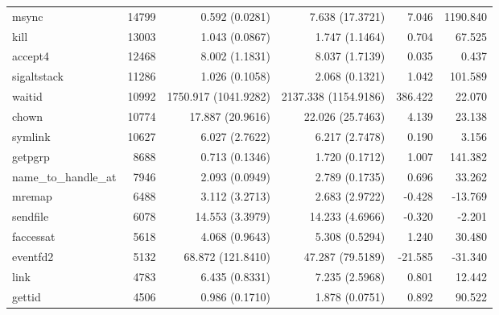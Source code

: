 \begin{longtable}{>{\ttfamily}lrrrrr}
                          msync &      14799 &              0.592 (0.0281) &           7.638 (17.3721) &           7.046 &     1190.840 \\
                           kill &      13003 &              1.043 (0.0867) &            1.747 (1.1464) &           0.704 &       67.525 \\
                        accept4 &      12468 &              8.002 (1.1831) &            8.037 (1.7139) &           0.035 &        0.437 \\
                    sigaltstack &      11286 &              1.026 (0.1058) &            2.068 (0.1321) &           1.042 &      101.589 \\
                         waitid &      10992 &        1750.917 (1041.9282) &      2137.338 (1154.9186) &         386.422 &       22.070 \\
                          chown &      10774 &            17.887 (20.9616) &          22.026 (25.7463) &           4.139 &       23.138 \\
                        symlink &      10627 &              6.027 (2.7622) &            6.217 (2.7478) &           0.190 &        3.156 \\
                        getpgrp &       8688 &              0.713 (0.1346) &            1.720 (0.1712) &           1.007 &      141.382 \\
           name\_to\_handle\_at &       7946 &              2.093 (0.0949) &            2.789 (0.1735) &           0.696 &       33.262 \\
                         mremap &       6488 &              3.112 (3.2713) &            2.683 (2.9722) &          -0.428 &      -13.769 \\
                       sendfile &       6078 &             14.553 (3.3979) &           14.233 (4.6966) &          -0.320 &       -2.201 \\
                      faccessat &       5618 &              4.068 (0.9643) &            5.308 (0.5294) &           1.240 &       30.480 \\
                       eventfd2 &       5132 &           68.872 (121.8410) &          47.287 (79.5189) &         -21.585 &      -31.340 \\
                           link &       4783 &              6.435 (0.8331) &            7.235 (2.5968) &           0.801 &       12.442 \\
                         gettid &       4506 &              0.986 (0.1710) &            1.878 (0.0751) &           0.892 &       90.522 \\

\end{longtable}
